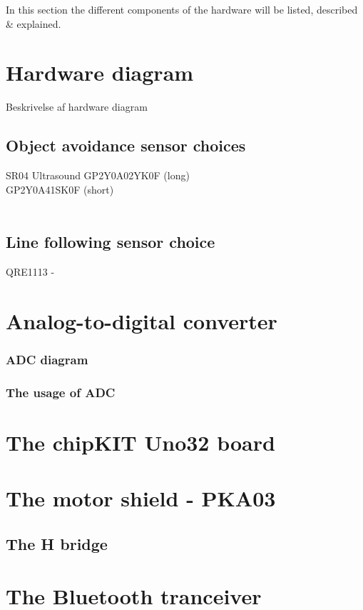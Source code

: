 In this section the different components of the hardware will be listed, described & explained.

\section{Hardware diagram}
Beskrivelse af hardware diagram


\subsection{Object avoidance sensor choices}
SR04 Ultrasound
GP2Y0A02YK0F (long) \\	
GP2Y0A41SK0F (short) \\
\\
\subsection{Line following sensor choice} 

QRE1113 - 
\section{Analog-to-digital converter}


\subsubsection{ADC diagram} 

\subsubsection{The usage of ADC}

\section{The chipKIT Uno32 board}


\section{The motor shield - PKA03}

\subsection{The H bridge}


\section{The Bluetooth tranceiver}

